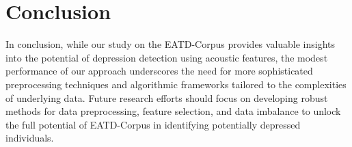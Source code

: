 
\section{Conclusion}\label{sec:conclusion}

In conclusion, while our study on the EATD-Corpus provides valuable insights into the potential of depression detection using acoustic features, the modest performance of our approach underscores the need for more sophisticated preprocessing techniques and algorithmic frameworks tailored to the complexities of underlying data. Future research efforts should focus on developing robust methods for data preprocessing, feature selection, and data imbalance to unlock the full potential of EATD-Corpus in identifying potentially depressed individuals.